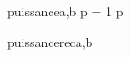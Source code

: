 \begin{algo}{puissance}{a,b}
    \SET p = 1
    \RETURN p
    \end{algo}
    
    \begin{algo}{puissancerec}{a,b}
    \end{algo}
    
